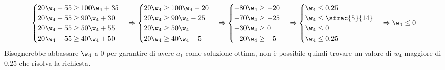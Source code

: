 \documentclass[\main/main.tex]{subfiles}
\begin{document}
\[
  \begin{cases}
    20\w_4 + 55 \geq 100\w_4 + 35 \\
    20\w_4 + 55 \geq 90\w_4 + 30  \\
    20\w_4 + 55 \geq 50\w_4 + 55  \\
    20\w_4 + 55 \geq 40\w_4 + 50  \\
  \end{cases}
  \Rightarrow
  \begin{cases}
    20\w_4 \geq 100\w_4 - 20 \\
    20\w_4 \geq 90\w_4 - 25  \\
    20\w_4 \geq 50\w_4       \\
    20\w_4 \geq 40\w_4 - 5   \\
  \end{cases}
  \Rightarrow
  \begin{cases}
    -80\w_4 \geq - 20 \\
    -70\w_4 \geq - 25 \\
    -30\w_4 \geq 0    \\
    -20\w_4 \geq - 5  \\
  \end{cases}
  \Rightarrow
  \begin{cases}
    \w_4 \leq 0.25 \\
    \w_4 \leq \sfrac{5}{14} \\
    \w_4 \leq 0    \\
    \w_4 \leq 0.25 \\
  \end{cases}
  \Rightarrow
  \w_4 \leq 0
\]
Bisognerebbe abbassare $\w_4$ a $0$ per garantire di avere $a_1$ come soluzione ottima, non è possibile quindi trovare un valore di $w_4$ maggiore di $0.25$ che risolva la richiesta.
\end{document}
